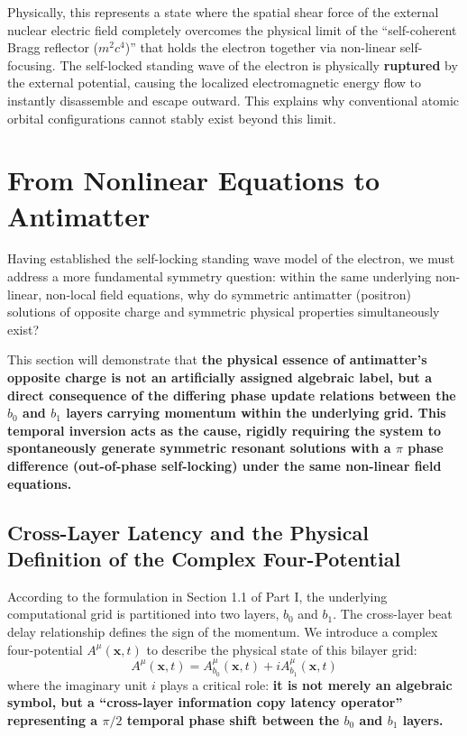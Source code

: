 \documentclass[12pt, a4paper]{article}
\begin{document}
Physically, this represents a state where the spatial shear force of the external nuclear electric field completely overcomes the physical limit of the ``self-coherent Bragg reflector ($m^2c^4$)'' that holds the electron together via non-linear self-focusing. The self-locked standing wave of the electron is physically \textbf{ruptured} by the external potential, causing the localized electromagnetic energy flow to instantly disassemble and escape outward. This explains why conventional atomic orbital configurations cannot stably exist beyond this limit.







\section{From Nonlinear Equations to Antimatter}

Having established the self-locking standing wave model of the electron, we must address a more fundamental symmetry question: within the same underlying non-linear, non-local field equations, why do symmetric antimatter (positron) solutions of opposite charge and symmetric physical properties simultaneously exist?

This section will demonstrate that \textbf{the physical essence of antimatter's opposite charge is not an artificially assigned algebraic label, but a direct consequence of the differing phase update relations between the $b_0$ and $b_1$ layers carrying momentum within the underlying grid. This temporal inversion acts as the cause, rigidly requiring the system to spontaneously generate symmetric resonant solutions with a $\pi$ phase difference (out-of-phase self-locking) under the same non-linear field equations.}

\subsection{Cross-Layer Latency and the Physical Definition of the Complex Four-Potential}

According to the formulation in Section 1.1 of Part I, the underlying computational grid is partitioned into two layers, $b_0$ and $b_1$. The cross-layer beat delay relationship defines the sign of the momentum. We introduce a complex four-potential $A^\mu(\mathbf{x}, t)$ to describe the physical state of this bilayer grid:
\begin{equation}
    A^\mu(\mathbf{x}, t) = A^\mu_{b_0}(\mathbf{x}, t) + i A^\mu_{b_1}(\mathbf{x}, t) 
\end{equation}
where the imaginary unit $i$ plays a critical role: \textbf{it is not merely an algebraic symbol, but a ``cross-layer information copy latency operator'' representing a $\pi/2$ temporal phase shift between the $b_0$ and $b_1$ layers.}
\end{document}
